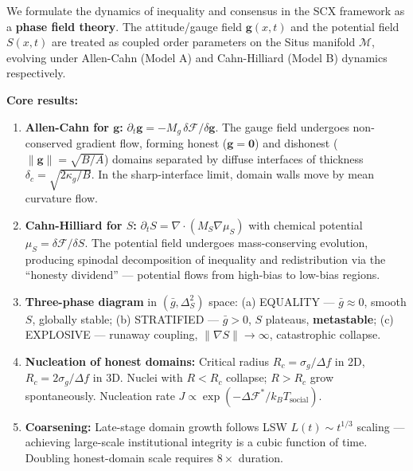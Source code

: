 \documentclass[12pt,a4paper]{article}
\theoremstyle{plain}
\theoremstyle{definition}
\newcommand{\cM}{\mathcal{M}}
\newcommand{\cF}{\mathcal{F}}
\newcommand{\gf}{\mathbf{g}}          %
\newcommand{\Sf}{S}                   %
\newcommand{\deltac}{\delta_c}        %
\newcommand{\Rc}{R_c}                 %
\newcommand{\gbar}{\bar{g}}           %
\begin{document}
\begin{scxbox}[ Abstract]
\noindent
We formulate the dynamics of inequality and consensus in the SCX framework
as a \textbf{phase field theory}. The attitude/gauge field $\gf(x,t)$ and the
potential field $\Sf(x,t)$ are treated as coupled order parameters on the
Situs manifold $\cM$, evolving under Allen-Cahn (Model A) and Cahn-Hilliard
(Model B) dynamics respectively.

\textbf{Core results:}
\begin{enumerate}[label=(\arabic*)]
    \item \textbf{Allen-Cahn for $\gf$:} $\partial_t \gf = -M_g\,\delta\cF/\delta\gf$.
          The gauge field undergoes non-conserved gradient flow, forming honest
          ($\gf=\mathbf{0}$) and dishonest ($\|\gf\|=\sqrt{B/A}$) domains
          separated by diffuse interfaces of thickness $\deltac = \sqrt{2\kappa_g/B}$.
          In the sharp-interface limit, domain walls move by mean curvature flow.

    \item \textbf{Cahn-Hilliard for $\Sf$:} $\partial_t \Sf = \nabla\cdot(M_S\nabla\mu_S)$
          with chemical potential $\mu_S = \delta\cF/\delta\Sf$. The potential field
          undergoes mass-conserving evolution, producing spinodal decomposition of
          inequality and redistribution via the ``honesty dividend'' — potential
          flows from high-bias to low-bias regions.

    \item \textbf{Three-phase diagram} in $(\gbar, \Delta_S^2)$ space:
          (a) \textcolor{phaseblue}{EQUALITY} — $\gbar \approx 0$, smooth $\Sf$,
          globally stable; (b) \textcolor{phaseyellow}{STRATIFIED} — $\gbar > 0$,
          $\Sf$ plateaus, \textbf{metastable}; (c) \textcolor{phasered}{EXPLOSIVE} —
          runaway coupling, $\|\nabla\Sf\|\to\infty$, catastrophic collapse.

    \item \textbf{Nucleation of honest domains:} Critical radius $\Rc = \sigma_g/\Delta f$
          in 2D, $\Rc = 2\sigma_g/\Delta f$ in 3D. Nuclei with $R < \Rc$ collapse;
          $R > \Rc$ grow spontaneously. Nucleation rate $J \propto \exp(-\Delta\cF^*/k_B T_{\text{social}})$.

    \item \textbf{Coarsening:} Late-stage domain growth follows LSW $L(t) \sim t^{1/3}$
          scaling — achieving large-scale institutional integrity is a cubic function
          of time. Doubling honest-domain scale requires $8\times$ duration.


\end{enumerate}
\end{scxbox}
\end{document}
